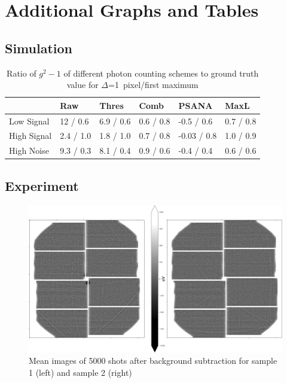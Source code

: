 \chapter{Additional Graphs and Tables}
\section{Simulation}
\begin{table}
	\caption{Ratio of $g^2-1$ of different photon counting schemes to ground truth value  for $\Delta$=1\, pixel/first maximum}
	\begin{tabular}{llllll}
		
		\toprule
		{} &           Raw &        Thres &         Comb &         PSANA &         MaxL \\
		\midrule
		Low Signal  &  12 / 0.6 &  6.9 / 0.6 &  0.6 / 0.8 &   -0.5 / 0.6 &  0.7 / 0.8 \\
		High Signal &    2.4 / 1.0 &  1.8 / 1.0 &  0.7 / 0.8 &  -0.03 / 0.8 &  1.0 / 0.9 \\
		High Noise  &    9.3 / 0.3 &  8.1 / 0.4 &  0.9 / 0.6 &  -0.4 / 0.4 &  0.6 / 0.6 \\
		\bottomrule
	\end{tabular}
\end{table}
\section{Experiment}

\begin{figure}
	\centering
	\includegraphics[width=0.8\linewidth]{images/kossel_gaas.png}
	\caption{Mean images of 5000 shots after background subtraction for sample 1 (left) and sample 2 (right)}
	\label{fig:kosselgaasmean}
\end{figure}


